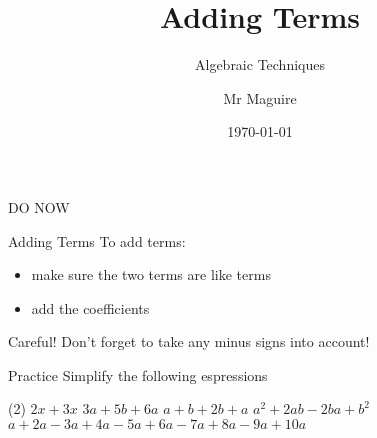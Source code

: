 \documentclass[bigger]{beamer}
\author{Mr Maguire}
\date{\today}
\title{Adding Terms}
\subtitle{Algebraic Techniques}
\begin{document}
\maketitle
\begin{frame}[label={sec:org48613ac}]{DO NOW}
\end{frame}
\begin{frame}[label={sec:orgb7dd7d3}]{Adding Terms}
To add terms:
\begin{itemize}
\item make sure the two terms are \alert{like} terms
\item add the coefficients
\end{itemize}
\begin{block}{Careful!}
Don't forget to take any minus signs into account!
\end{block}
\end{frame}
\begin{frame}[label={sec:orge0bbb64}]{Practice}
Simplify the following espressions
\begin{tasks}[after-item-skip=8ex](2)
\task $2x+3x$
\task $3a+5b+6a$
\task $a+b+2b+a$
\task $a^{2}+2ab-2ba+b^{2}$
\task* $a+2a-3a+4a-5a+6a-7a+8a-9a+10a$
\end{tasks}
\end{frame}
\end{document}
